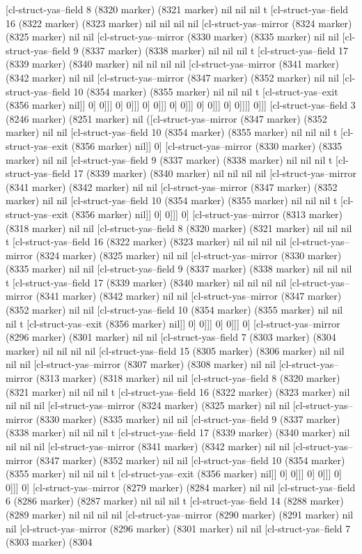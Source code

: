 {{[cl-struct-yas--field 8 (8320 marker) (8321 marker) nil nil nil t [cl-struct-yas--field 16 (8322 marker) (8323 marker) nil nil nil nil [cl-struct-yas--mirror (8324 marker) (8325 marker) nil nil [cl-struct-yas--mirror (8330 marker) (8335 marker) nil nil [cl-struct-yas--field 9 (8337 marker) (8338 marker) nil nil nil t [cl-struct-yas--field 17 (8339 marker) (8340 marker) nil nil nil nil [cl-struct-yas--mirror (8341 marker) (8342 marker) nil nil [cl-struct-yas--mirror (8347 marker) (8352 marker) nil nil [cl-struct-yas--field 10 (8354 marker) (8355 marker) nil nil nil t [cl-struct-yas--exit (8356 marker) nil]] 0] 0]]] 0] 0]]] 0] 0]]] 0] 0]]] 0] 0]]] 0] 0]]]] 0]]] [cl-struct-yas--field 3 (8246 marker) (8251 marker) nil ([cl-struct-yas--mirror (8347 marker) (8352 marker) nil nil [cl-struct-yas--field 10 (8354 marker) (8355 marker) nil nil nil t [cl-struct-yas--exit (8356 marker) nil]] 0] [cl-struct-yas--mirror (8330 marker) (8335 marker) nil nil [cl-struct-yas--field 9 (8337 marker) (8338 marker) nil nil nil t [cl-struct-yas--field 17 (8339 marker) (8340 marker) nil nil nil nil [cl-struct-yas--mirror (8341 marker) (8342 marker) nil nil [cl-struct-yas--mirror (8347 marker) (8352 marker) nil nil [cl-struct-yas--field 10 (8354 marker) (8355 marker) nil nil nil t [cl-struct-yas--exit (8356 marker) nil]] 0] 0]]] 0] [cl-struct-yas--mirror (8313 marker) (8318 marker) nil nil [cl-struct-yas--field 8 (8320 marker) (8321 marker) nil nil nil t [cl-struct-yas--field 16 (8322 marker) (8323 marker) nil nil nil nil [cl-struct-yas--mirror (8324 marker) (8325 marker) nil nil [cl-struct-yas--mirror (8330 marker) (8335 marker) nil nil [cl-struct-yas--field 9 (8337 marker) (8338 marker) nil nil nil t [cl-struct-yas--field 17 (8339 marker) (8340 marker) nil nil nil nil [cl-struct-yas--mirror (8341 marker) (8342 marker) nil nil [cl-struct-yas--mirror (8347 marker) (8352 marker) nil nil [cl-struct-yas--field 10 (8354 marker) (8355 marker) nil nil nil t [cl-struct-yas--exit (8356 marker) nil]] 0] 0]]] 0] 0]]] 0] [cl-struct-yas--mirror (8296 marker) (8301 marker) nil nil [cl-struct-yas--field 7 (8303 marker) (8304 marker) nil nil nil nil [cl-struct-yas--field 15 (8305 marker) (8306 marker) nil nil nil nil [cl-struct-yas--mirror (8307 marker) (8308 marker) nil nil [cl-struct-yas--mirror (8313 marker) (8318 marker) nil nil [cl-struct-yas--field 8 (8320 marker) (8321 marker) nil nil nil t [cl-struct-yas--field 16 (8322 marker) (8323 marker) nil nil nil nil [cl-struct-yas--mirror (8324 marker) (8325 marker) nil nil [cl-struct-yas--mirror (8330 marker) (8335 marker) nil nil [cl-struct-yas--field 9 (8337 marker) (8338 marker) nil nil nil t [cl-struct-yas--field 17 (8339 marker) (8340 marker) nil nil nil nil [cl-struct-yas--mirror (8341 marker) (8342 marker) nil nil [cl-struct-yas--mirror (8347 marker) (8352 marker) nil nil [cl-struct-yas--field 10 (8354 marker) (8355 marker) nil nil nil t [cl-struct-yas--exit (8356 marker) nil]] 0] 0]]] 0] 0]]] 0] 0]]] 0] [cl-struct-yas--mirror (8279 marker) (8284 marker) nil nil [cl-struct-yas--field 6 (8286 marker) (8287 marker) nil nil nil t [cl-struct-yas--field 14 (8288 marker) (8289 marker) nil nil nil nil [cl-struct-yas--mirror (8290 marker) (8291 marker) nil nil [cl-struct-yas--mirror (8296 marker) (8301 marker) nil nil [cl-struct-yas--field 7 (8303 marker) (8304 }}
